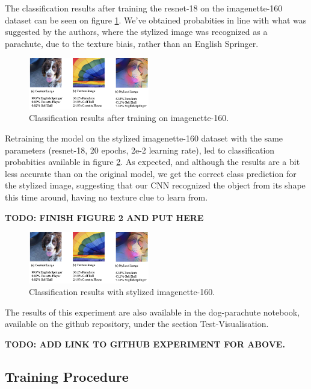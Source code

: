 \documentclass{article}
\begin{document}
\noindent
The classification results after training the resnet-18 on the imagenette-160 dataset 
can be seen on figure \ref{dog-parachute}.
We've obtained probabities in line with what was suggested by the authors, 
where the stylized image was recognized as a parachute, 
due to the texture biais, rather than an English Springer.

\begin{figure}[h!]\center
  \includegraphics[width=0.47\textwidth]{imgs/results-textures}
  \caption{Classification results after training on imagenette-160.}
  \label{dog-parachute}
\end{figure}

\noindent
Retraining the model on the stylized imagenette-160 dataset with the same parameters 
(resnet-18, 20 epochs, 2e-2 learning rate), 
led to classification probabities available in figure \ref{stylized-dog-parachute}.
As expected, and although the results are a bit less accurate than on the original model, 
we get the correct class prediction for the stylized image, suggesting that our CNN recognized the object
from its shape this time around, having no texture clue to learn from.

\textbf{TODO: FINISH FIGURE 2 AND PUT HERE}

\begin{figure}[h!]\center
  \includegraphics[width=0.47\textwidth]{imgs/results-textures}
  \caption{Classification results with stylized imagenette-160.}
  \label{stylized-dog-parachute}
\end{figure}

\noindent
The results of this experiment are also available in the dog-parachute notebook, 
available on the github repository, under the section Test-Visualisation.

\textbf{TODO: ADD LINK TO GITHUB EXPERIMENT FOR ABOVE.}

\subsection{Training Procedure}
\end{document}

